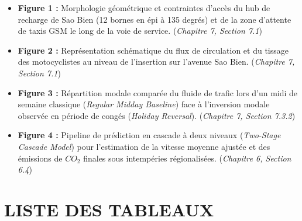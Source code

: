 \documentclass[11pt, a4paper]{article}
\providecommand{\tightlist}{}
\begin{document}
\begin{itemize}
\tightlist
\item
  \textbf{Figure 1 :} Morphologie géométrique et contraintes d'accès du
  hub de recharge de Sao Bien (12 bornes en épi à 135 degrés) et de la
  zone d'attente de taxis GSM le long de la voie de service.
  (\emph{Chapitre 7, Section 7.1})
\item
  \textbf{Figure 2 :} Représentation schématique du flux de circulation
  et du tissage des motocyclistes au niveau de l'insertion sur l'avenue
  Sao Bien. (\emph{Chapitre 7, Section 7.1})
\item
  \textbf{Figure 3 :} Répartition modale comparée du fluide de trafic
  lors d'un midi de semaine classique (\emph{Regular Midday Baseline})
  face à l'inversion modale observée en période de congés (\emph{Holiday
  Reversal}). (\emph{Chapitre 7, Section 7.3.2})
\item
  \textbf{Figure 4 :} Pipeline de prédiction en cascade à deux niveaux
  (\emph{Two-Stage Cascade Model}) pour l'estimation de la vitesse
  moyenne ajustée et des émissions de \(CO_2\) finales sous intempéries
  régionalisées. (\emph{Chapitre 6, Section 6.4})
\end{itemize}

\newpage

\section{LISTE DES TABLEAUX}\label{liste-des-tableaux}
\end{document}
